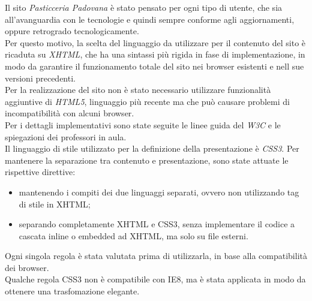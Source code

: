 Il sito \emph{Pasticceria Padovana} è stato pensato per ogni tipo di utente, che sia all'avanguardia con le tecnologie 
e quindi sempre conforme agli aggiornamenti, oppure retrogrado tecnologicamente.\\
Per questo motivo, la scelta del linguaggio da utilizzare per il contenuto del sito è ricaduta su \emph{XHTML},
che ha una sintassi più rigida in fase di implementazione, in modo da garantire il funzionamento totale del sito nei browser esistenti 
e nell sue versioni precedenti.\\
Per la realizzazione del sito non è stato necessario utilizzare funzionalità aggiuntive di \emph{HTML5}, linguaggio più recente ma che può causare
problemi di incompatibilità con alcuni browser.\\
Per i dettagli implementativi sono state seguite le linee guida del \emph{W3C} e le spiegazioni dei professori in aula.\\
Il linguaggio di stile utilizzato per la definizione della presentazione è \emph{CSS3}. 
Per mantenere la separazione tra contenuto e presentazione, sono state attuate le rispettive direttive: 
\begin{itemize}
    \item mantenendo i compiti dei due linguaggi separati, ovvero non utilizzando tag di stile in XHTML;
    \item separando completamente XHTML e CSS3, senza implementare il codice a cascata inline o embedded ad XHTML, ma solo su file esterni.
\end{itemize}
Ogni singola regola è stata valutata prima di utilizzarla, in base alla compatibilità dei browser.\\
Qualche regola CSS3 non è compatibile con IE8, ma è stata applicata in modo da ottenere una trasfomazione elegante.


